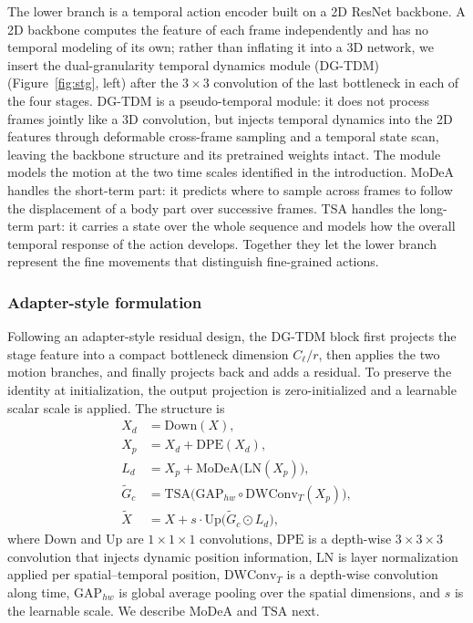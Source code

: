 The lower branch is a temporal action encoder built on a 2D ResNet backbone.
A 2D backbone computes the feature of each frame independently and has no
temporal modeling of its own; rather than inflating it into a 3D network, we
insert the dual-granularity temporal dynamics module (DG-TDM)
(Figure~\ref{fig:stg}, left) after the $3\times3$ convolution of the last
bottleneck in each of the four stages. DG-TDM is a pseudo-temporal module: it
does not process frames jointly like a 3D convolution, but injects temporal
dynamics into the 2D features through deformable cross-frame sampling and a
temporal state scan, leaving the backbone structure and its pretrained weights
intact. The module models the motion at the two time scales identified in the
introduction. MoDeA handles the short-term part: it predicts where to sample
across frames to follow the displacement of a body part over successive
frames. TSA handles the long-term part: it carries a state over the whole
sequence and models how the overall temporal response of the action develops.
Together they let the lower branch represent the fine movements that
distinguish fine-grained actions.

\subsubsection{Adapter-style formulation}
\label{sec:adapter}

Following an adapter-style residual design, the DG-TDM block first projects the
stage feature into a compact bottleneck dimension $C_\ell / r$, then applies
the two motion branches, and finally projects back and adds a residual. To
preserve the identity at initialization, the output projection is zero-initialized
and a learnable scalar scale is applied. The structure is
\begin{align}
  X_d &= \mathrm{Down}(X), \label{eq:down}\\
  X_p &= X_d + \mathrm{DPE}(X_d), \label{eq:dpe}\\
  L_d &= X_p + \mathrm{MoDeA}\big(\mathrm{LN}(X_p)\big), \label{eq:modelocal}\\
  \tilde{G}_c &= \mathrm{TSA}\big(\mathrm{GAP}_{hw}\circ \mathrm{DWConv}_T(X_p)\big),
       \label{eq:tsagate}\\
  \tilde{X} &= X + s \cdot \mathrm{Up}\big(\tilde{G}_c \odot L_d\big),
       \label{eq:adapterout}
\end{align}
where $\mathrm{Down}$ and $\mathrm{Up}$ are $1\times1\times1$ convolutions,
$\mathrm{DPE}$ is a depth-wise $3\times3\times3$ convolution that injects
dynamic position information, $\mathrm{LN}$ is layer normalization applied per
spatial--temporal position, $\mathrm{DWConv}_T$ is a depth-wise convolution
along time, $\mathrm{GAP}_{hw}$ is global average pooling over the spatial
dimensions, and $s$ is the learnable scale. We describe $\mathrm{MoDeA}$ and
$\mathrm{TSA}$ next.

